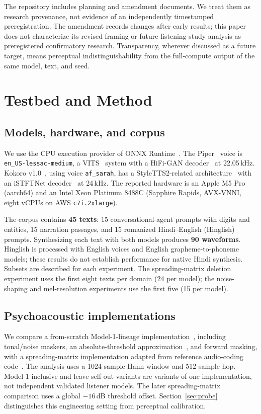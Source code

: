 \documentclass[11pt,a4paper]{article}
\begin{document}
The repository includes planning and amendment documents. We treat them as research provenance, not evidence of an independently timestamped preregistration. The amendment records changes after early results; this paper does not characterize its revised framing or future listening-study analysis as preregistered confirmatory research. Transparency, wherever discussed as a future target, means perceptual indistinguishability from the full-compute output of the same model, text, and seed.

\section{Testbed and Method}
\subsection{Models, hardware, and corpus}
We use the CPU execution provider of ONNX Runtime~\cite{onnxruntime}. The Piper~\cite{piper} voice is \texttt{en\_US-lessac-medium}, a VITS~\cite{kim2021vits} system with a HiFi-GAN decoder~\cite{kong2020hifigan} at 22.05\,kHz. Kokoro v1.0~\cite{kokoro}, using voice \texttt{af\_sarah}, has a StyleTTS2-related architecture~\cite{li2023styletts2} with an iSTFTNet decoder~\cite{kaneko2022istftnet} at 24\,kHz. The reported hardware is an Apple M5 Pro (aarch64) and an Intel Xeon Platinum 8488C (Sapphire Rapids, AVX-VNNI, eight vCPUs on AWS \texttt{c7i.2xlarge}).

The corpus contains \textbf{45 texts}: 15 conversational-agent prompts with digits and entities, 15 narration passages, and 15 romanized Hindi--English (Hinglish) prompts. Synthesizing each text with both models produces \textbf{90 waveforms}. Hinglish is processed with English voices and English grapheme-to-phoneme models; these results do not establish performance for native Hindi synthesis. Subsets are described for each experiment. The spreading-matrix deletion experiment uses the first eight texts per domain (24 per model); the noise-shaping and mel-resolution experiments use the first five (15 per model).

\subsection{Psychoacoustic implementations}
We compare a from-scratch Model-1-lineage implementation~\cite{iso11172,bosi2003introduction}, including tonal/noise maskers, an absolute-threshold approximation~\cite{terhardt1979pitch}, and forward masking, with a spreading-matrix implementation adapted from reference audio-coding code~\cite{schuller2020filter}. The analysis uses a 1024-sample Hann window and 512-sample hop. Model-1 inclusive and leave-self-out variants are variants of one implementation, not independent validated listener models. The later spreading-matrix comparison uses a global $-16$\,dB threshold offset. Section~\ref{sec:probe} distinguishes this engineering setting from perceptual calibration.
\end{document}
